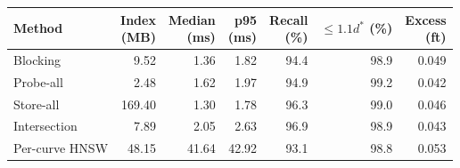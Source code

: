 \begin{tabular}{lrrrrrr}
\toprule
Method & \shortstack{Index\\(MB)} & \shortstack{Median\\(ms)} & \shortstack{p95\\(ms)} & \shortstack{Recall\\(\%)} & \shortstack{$\le1.1d^*$\\(\%)} & \shortstack{Excess\\(ft)}\\
\midrule
Blocking & 9.52 & 1.36 & 1.82 & 94.4 & 98.9 & 0.049\\
Probe-all & 2.48 & 1.62 & 1.97 & 94.9 & 99.2 & 0.042\\
Store-all & 169.40 & 1.30 & 1.78 & 96.3 & 99.0 & 0.046\\
Intersection & 7.89 & 2.05 & 2.63 & 96.9 & 98.9 & 0.043\\
Per-curve HNSW & 48.15 & 41.64 & 42.92 & 93.1 & 98.8 & 0.053\\
\bottomrule
\end{tabular}
